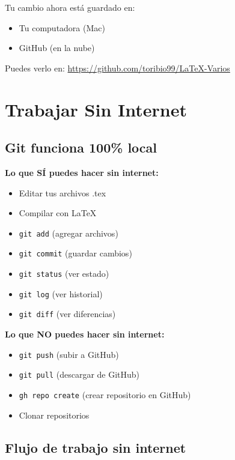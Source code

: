 \documentclass[12pt,a4paper]{article}
\begin{document}
\begin{successbox}[¡Listo!]
Tu cambio ahora está guardado en:
\begin{itemize}
  \item Tu computadora (Mac)
  \item GitHub (en la nube)
\end{itemize}

Puedes verlo en: \url{https://github.com/toribio99/LaTeX-Varios}
\end{successbox}

\section{Trabajar Sin Internet}

\subsection{Git funciona 100\% local}

\textbf{Lo que SÍ puedes hacer sin internet:}
\begin{itemize}
  \item Editar tus archivos .tex
  \item Compilar con LaTeX
  \item \texttt{git add} (agregar archivos)
  \item \texttt{git commit} (guardar cambios)
  \item \texttt{git status} (ver estado)
  \item \texttt{git log} (ver historial)
  \item \texttt{git diff} (ver diferencias)
\end{itemize}

\textbf{Lo que NO puedes hacer sin internet:}
\begin{itemize}
  \item \texttt{git push} (subir a GitHub)
  \item \texttt{git pull} (descargar de GitHub)
  \item \texttt{gh repo create} (crear repositorio en GitHub)
  \item Clonar repositorios
\end{itemize}

\subsection{Flujo de trabajo sin internet}
\end{document}
